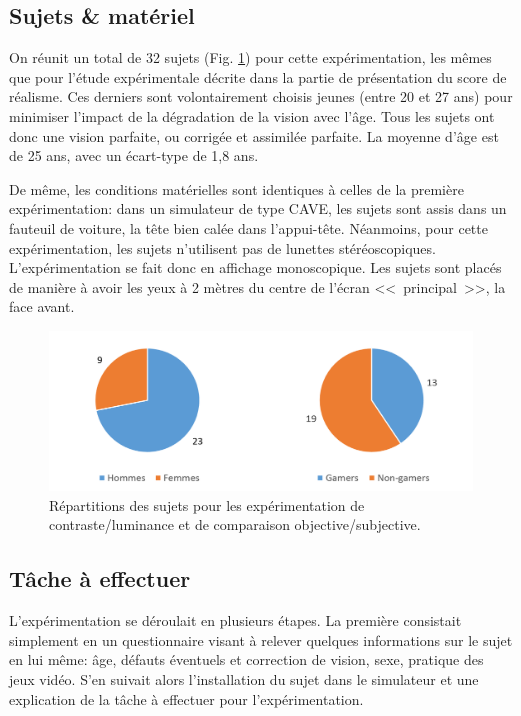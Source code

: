 	\subsection{Sujets \& matériel}
	\par On réunit un total de 32 sujets (Fig. \ref{fig:expe_sujets}) pour cette expérimentation, les mêmes que pour l'étude expérimentale décrite dans la partie de présentation du score de réalisme. Ces derniers sont volontairement choisis jeunes (entre 20 et 27 ans) pour minimiser l'impact de la dégradation de la vision avec l'âge. Tous les sujets ont donc une vision parfaite, ou corrigée et assimilée parfaite. La moyenne d'âge est de 25 ans, avec un écart-type de 1,8 ans.
	
	\par De même, les conditions matérielles sont identiques à celles de la première expérimentation: dans un simulateur de type CAVE, les sujets sont assis dans un fauteuil de voiture, la tête bien calée dans l'appui-tête. Néanmoins, pour cette expérimentation, les sujets n'utilisent pas de lunettes stéréoscopiques. L'expérimentation se fait donc en affichage monoscopique. Les sujets sont placés de manière à avoir les yeux à 2 mètres du centre de l'écran <<~principal~>>, la face avant.
	
	\begin{figure}
		\centering
		\includegraphics[scale=0.8]{Figures/SubjectsCharts}
		\caption{Répartitions des sujets pour les expérimentation de contraste/luminance et de comparaison objective/subjective.}
		\label{fig:expe_sujets}
	\end{figure}
	
	\subsection{Tâche à effectuer}
	\par L'expérimentation se déroulait en plusieurs étapes. La première consistait simplement en un questionnaire visant à relever quelques informations sur le sujet en lui même: âge, défauts éventuels et correction de vision, sexe, pratique des jeux vidéo. S'en suivait alors l'installation du sujet dans le simulateur et une explication de la tâche à effectuer pour l'expérimentation.
	
